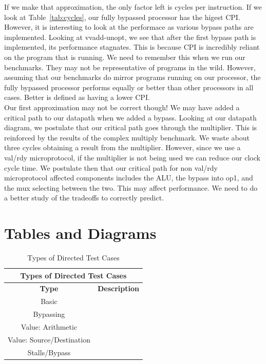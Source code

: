 \documentclass[10pt]{article}
\begin{document}
If we make that approximation, the only factor left is cycles per instruction. 
If we look at Table~\ref{tab:cycles}, our fully bypassed processor has the higest CPI.
However, it is interesting to look at the performace as various bypass paths are implemented.
Looking at vvadd-unopt, we see that after the first bypass path is implemented, its performance stagnates.
This is because CPI is incredibly reliant on the program that is running. 
We need to remember this when we run our benchmarks. 
They may not be representative of programs in the wild. 
However, assuming that our benchmarks do mirror programs running on our processor, the fully bypassed processor performs equally or better than other processors in all cases. Better is defined as having a lower CPI. \\

Our first approximation may not be correct though!
We may have added a critical path to our datapath when we added a bypass.
Looking at our datapath diagram, we postulate that our critical path goes through the multiplier.
This is reinforced by the results of the complex multiply benchmark.
We waste about three cycles obtaining a result from the multiplier.
However, since we use a val/rdy microprotocol, if the multiplier is not being used we can reduce our clock cycle time.
We postulate then that our critical path for non val/rdy microprotocol affected components includes the ALU, the bypass into op1, and the mux selecting between the two.
This may affect performance. We need to do a better study of the tradeoffs to correctly predict.

\pagebreak[4]

\section {Tables and Diagrams}


\begin{table}[h]
\begin{center}
\begin{tabular}{| c | c |}
\hline
\multicolumn{2}{|c|}{Types of Directed Test Cases}   \\
\hline
\textbf{Type}                         &    \textbf{Description}  	\\   \hline      
Basic            					  &           					\\
Bypassing                             &								\\
Value: Arithmetic           		  &          					\\        
Value: Source/Destination             & 							\\
Stalls/Bypass 						  & 							\\
\hline                                                 
\end{tabular}
\caption{Types of Directed Test Cases} 
\label{table:tests}
\end{center}
\end{table}
\end{document}
